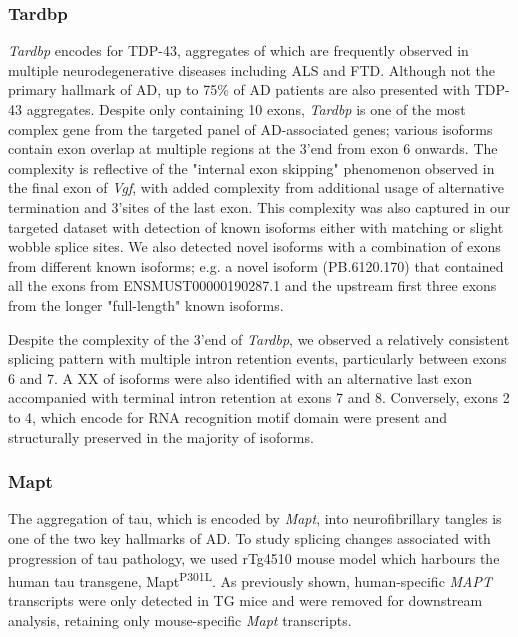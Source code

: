 \subsubsection{Tardbp}
\textit{Tardbp} encodes for TDP-43, aggregates of which are frequently observed in multiple neurodegenerative diseases including ALS and FTD. Although not the primary hallmark of AD, up to 75\% of AD patients are also presented with TDP-43 aggregates. Despite only containing 10 exons, \textit{Tardbp} is one of the most complex gene from the targeted panel of AD-associated genes; various isoforms contain exon overlap at multiple regions at the 3'end from exon 6 onwards. The complexity is reflective of the "internal exon skipping" phenomenon observed in the final exon of \textit{Vgf}, with added complexity from additional usage of alternative termination and 3'sites of the last exon. This complexity was also captured in our targeted dataset with detection of known isoforms either with matching or slight wobble splice sites. We also detected novel isoforms with a combination of exons from different known isoforms; e.g. a novel isoform (PB.6120.170) that contained all the exons from ENSMUST00000190287.1 and the upstream first three exons from the longer "full-length" known isoforms. 

Despite the complexity of the 3'end of \textit{Tardbp}, we observed a relatively consistent splicing pattern with multiple intron retention events, particularly between exons 6 and 7. A XX of isoforms were also identified with an alternative last exon accompanied with terminal intron retention at exons 7 and 8. Conversely, exons 2 to 4, which encode for RNA recognition motif domain were present and structurally preserved in the majority of isoforms.  



\subsubsection{Mapt}
The aggregation of tau, which is encoded by \textit{Mapt}, into neurofibrillary tangles is one of the two key hallmarks of AD. To study splicing changes associated with progression of tau pathology, we used rTg4510 mouse model which harbours the human tau transgene, Mapt\textsuperscript{P301L}. As previously shown, human-specific \textit{MAPT} transcripts were only detected in TG mice and were removed for downstream analysis, retaining only mouse-specific \textit{Mapt} transcripts. 

